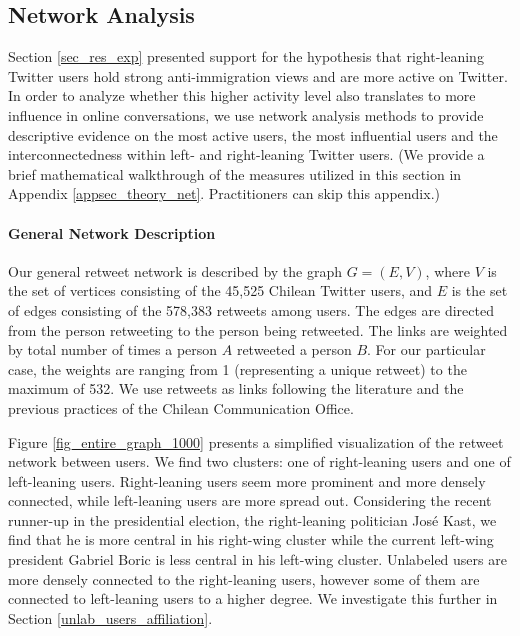 \subsection{Network Analysis}\label{sec_res_nets}
        
        Section \ref{sec_res_exp} presented support for the hypothesis that right-leaning Twitter users hold strong anti-immigration views and are more active on Twitter. In order to analyze whether this higher activity level also translates to more influence in online conversations, we use network analysis methods to provide descriptive evidence on the most active users, the most influential users and the interconnectedness within left- and right-leaning Twitter users. (We provide a brief mathematical walkthrough of the measures utilized in this section in Appendix \ref{appsec_theory_net}. Practitioners can skip this appendix.)  
        
        
    \paragraph{General Network Description}
       
        Our general retweet network is described by the graph $G=(E,V)$, where $V$ is the set of vertices consisting of the 45,525 Chilean Twitter users, and $E$ is the set of edges consisting of the 578,383 retweets among users. The edges are directed from the person retweeting  to the person being retweeted. The links are weighted by total number of times a person $A$ retweeted a person $B$. For our particular case, the weights are ranging from 1 (representing a unique retweet) to the maximum of 532. We use retweets as links following the literature and the previous practices of the Chilean Communication Office.
        
        Figure \ref{fig_entire_graph_1000} presents a simplified visualization of the retweet network between users. We find two clusters: one of right-leaning users and one of left-leaning users. Right-leaning users seem more prominent and more densely connected, while left-leaning users are more spread out. Considering the recent runner-up in the presidential election, the right-leaning politician José Kast, we find that he is more central in his right-wing cluster while the current left-wing president Gabriel Boric is less central in his left-wing cluster. Unlabeled users are more densely connected to the right-leaning users, however some of them are connected to left-leaning users to a higher degree. We investigate this further in Section \ref{unlab_users_affiliation}.


